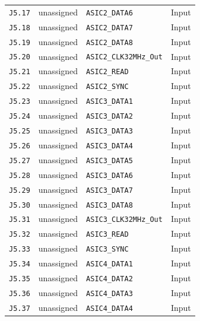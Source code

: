 \documentclass[11pt,a4paper]{article}
\begin{document}
\begin{longtable}{@{}P{19mm}P{36mm}P{78mm}P{33mm}@{}}
\nolinkurl{J5.17} & \textcolor{muted}{unassigned} & \nolinkurl{ASIC2_DATA6} & Input \\
\nolinkurl{J5.18} & \textcolor{muted}{unassigned} & \nolinkurl{ASIC2_DATA7} & Input \\
\nolinkurl{J5.19} & \textcolor{muted}{unassigned} & \nolinkurl{ASIC2_DATA8} & Input \\
\nolinkurl{J5.20} & \textcolor{muted}{unassigned} & \nolinkurl{ASIC2_CLK32MHz_Out} & Input \\
\nolinkurl{J5.21} & \textcolor{muted}{unassigned} & \nolinkurl{ASIC2_READ} & Input \\
\nolinkurl{J5.22} & \textcolor{muted}{unassigned} & \nolinkurl{ASIC2_SYNC} & Input \\
\nolinkurl{J5.23} & \textcolor{muted}{unassigned} & \nolinkurl{ASIC3_DATA1} & Input \\
\nolinkurl{J5.24} & \textcolor{muted}{unassigned} & \nolinkurl{ASIC3_DATA2} & Input \\
\nolinkurl{J5.25} & \textcolor{muted}{unassigned} & \nolinkurl{ASIC3_DATA3} & Input \\
\nolinkurl{J5.26} & \textcolor{muted}{unassigned} & \nolinkurl{ASIC3_DATA4} & Input \\
\nolinkurl{J5.27} & \textcolor{muted}{unassigned} & \nolinkurl{ASIC3_DATA5} & Input \\
\nolinkurl{J5.28} & \textcolor{muted}{unassigned} & \nolinkurl{ASIC3_DATA6} & Input \\
\nolinkurl{J5.29} & \textcolor{muted}{unassigned} & \nolinkurl{ASIC3_DATA7} & Input \\
\nolinkurl{J5.30} & \textcolor{muted}{unassigned} & \nolinkurl{ASIC3_DATA8} & Input \\
\nolinkurl{J5.31} & \textcolor{muted}{unassigned} & \nolinkurl{ASIC3_CLK32MHz_Out} & Input \\
\nolinkurl{J5.32} & \textcolor{muted}{unassigned} & \nolinkurl{ASIC3_READ} & Input \\
\nolinkurl{J5.33} & \textcolor{muted}{unassigned} & \nolinkurl{ASIC3_SYNC} & Input \\
\nolinkurl{J5.34} & \textcolor{muted}{unassigned} & \nolinkurl{ASIC4_DATA1} & Input \\
\nolinkurl{J5.35} & \textcolor{muted}{unassigned} & \nolinkurl{ASIC4_DATA2} & Input \\
\nolinkurl{J5.36} & \textcolor{muted}{unassigned} & \nolinkurl{ASIC4_DATA3} & Input \\
\nolinkurl{J5.37} & \textcolor{muted}{unassigned} & \nolinkurl{ASIC4_DATA4} & Input \\

\end{longtable}
\end{document}
